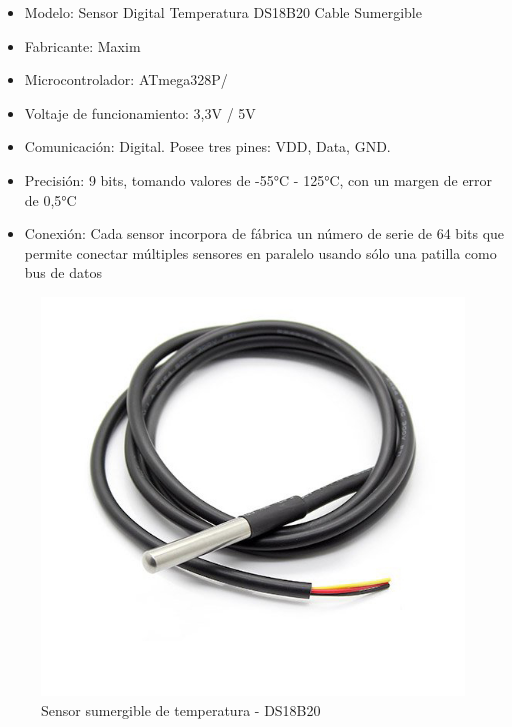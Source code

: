                 \begin{itemize}
                    \item Modelo: Sensor Digital Temperatura DS18B20 Cable Sumergible
                    \item Fabricante: Maxim
                    \item Microcontrolador: ATmega328P/
                    \item Voltaje de funcionamiento: 3,3V / 5V
                    \item Comunicación: Digital. Posee tres pines: VDD, Data, GND.
                    \item Precisión: 9 bits, tomando valores de -55°C - 125°C, con un margen de error de 0,5°C
                    \item Conexión: Cada sensor incorpora de fábrica un número de serie de 64 bits que permite conectar múltiples sensores en paralelo usando sólo una patilla como bus de datos
                \end{itemize}
                
                \begin{figure} [h]
                    \centering
                    \includegraphics[scale=0.35]{hardware/ds18b20.jpg}
                    \caption{Sensor sumergible de temperatura - DS18B20}
                    \label{SensorTemp}
                \end{figure}
                
